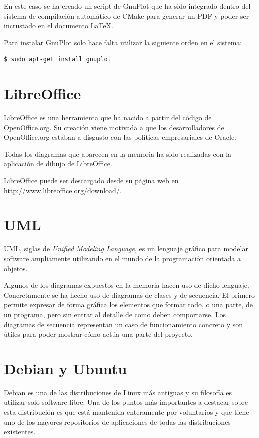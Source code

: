 En este caso se ha creado un script de GnuPlot que ha sido integrado dentro del sistema de compilación automático de CMake para generar un PDF y poder ser incrustado en el documento \LaTeX.

Para instalar GnuPlot solo hace falta utilizar la siguiente orden en el sistema:

\begin{verbatim}
$ sudo apt-get install gnuplot
\end{verbatim}

\section{LibreOffice}

LibreOffice es una herramienta que ha nacido a partir del código de OpenOffice.org. Su creación viene motivada a que los desarrolladores de OpenOffice.org estaban a disgusto con las políticas empresariales de Oracle.

Todas los diagramas que aparecen en la memoria ha sido realizadas con la aplicación de dibujo de LibreOffice.

LibreOffice puede ser descargado desde su página web en \url{http://www.libreoffice.org/download/}.

\section{UML}

UML, siglas de \emph{Unified Modeling Language}, es un lenguaje gráfico para modelar software ampliamente utilizando en el mundo de la programación orientada a objetos.

Algunos de los diagramas expuestos en la memoria hacen uso de dicho lenguaje. Concretamente se ha hecho uso de diagramas de clases y de secuencia. El primero permite expresar de forma gráfica los elementos que formar todo, o una parte, de un programa, pero sin entrar al detalle de como deben comportarse. Los diagramas de secuencia representan un caso de funcionamiento concreto y son útiles para poder mostrar cómo actúa una parte del proyecto.

\section{Debian y Ubuntu}

Debian es una de las distribuciones de Linux más antiguas y su filosofía es utilizar solo software libre. Una de los puntos más importantes a destacar sobre esta distribución es que está mantenida enteramente por voluntarios y que tiene uno de los mayores repositorios de aplicaciones de todas las distribuciones existentes.

